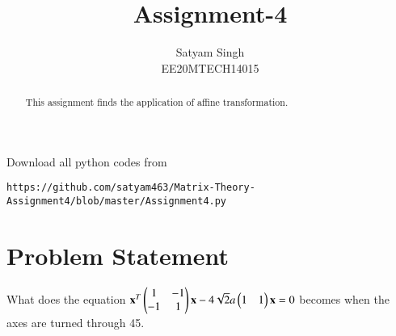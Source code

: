 \documentclass[journal,12pt,twocolumn]{IEEEtran}
\begin{document}
\renewcommand{\thefigure}{\theproblem}
\def\putbox#1#2#3{\makebox[0in][l]{\makebox[#1][l]{}\raisebox{\baselineskip}[0in][0in]{\raisebox{#2}[0in][0in]{#3}}}}
     \def\rightbox#1{\makebox[0in][r]{#1}}
     \def\centbox#1{\makebox[0in]{#1}}
     \def\topbox#1{\raisebox{-\baselineskip}[0in][0in]{#1}}
     \def\midbox#1{\raisebox{-0.5\baselineskip}[0in][0in]{#1}}
\vspace{3cm}
\title{Assignment-4}
\author{Satyam Singh \\ EE20MTECH14015}
\maketitle
\newpage
\bigskip
\renewcommand{\thefigure}{\theenumi}
\renewcommand{\thetable}{\theenumi}
\begin{abstract}
This assignment finds the application of affine transformation.
\end{abstract}
Download all python codes from 
\begin{lstlisting}
https://github.com/satyam463/Matrix-Theory-Assignment4/blob/master/Assignment4.py
\end{lstlisting}

\section{Problem Statement}
What does the equation  $\mathbf{x}^T\begin{pmatrix}1&-1\\-1&1\end{pmatrix}\mathbf{x}-4\sqrt{2}a\begin{pmatrix}1&1\end{pmatrix}\mathbf{x}=0$ 
becomes when the axes are turned through 45\degree.
\end{document}
